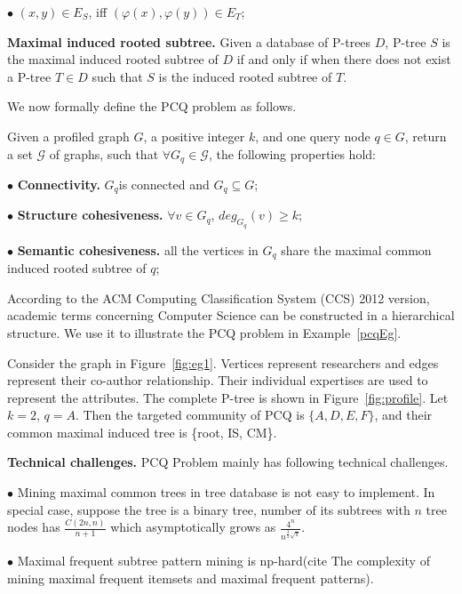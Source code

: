$\bullet$ $(x,y) \in E_S$, iff $(\varphi(x),\varphi(y)) \in E_T$;

{\bf Maximal induced rooted subtree.}
Given a database of P-trees $D$, P-tree $S$ is the maximal induced rooted subtree of $D$ if and only if when there does not exist a P-tree $T \in D$ such that $S$ is the induced rooted subtree of $T$. 

We now formally define the PCQ problem as follows. 

\begin{problem}[PCQ]
Given a profiled graph $G$, a positive integer $k$, and one query node $q \in G$, return a set $\mathcal {G}$ of graphs, such that $\forall G_q \in \mathcal {G}$, the following properties hold:

\vspace{1ex}
$\bullet$ \textbf{Connectivity.} $G_q$is connected and $G_q \subseteq G$;

$\bullet$ \textbf{Structure cohesiveness.} $\forall v\in G_q$, $deg_{G_q}(v)\geq k$;

$\bullet$ \textbf{Semantic cohesiveness.} all the vertices in $G_q$ share the maximal common induced rooted subtree of $q$;
\end{problem}

According to the ACM Computing Classification System (CCS) 2012 version, academic terms concerning Computer Science can be constructed in a hierarchical structure. We use it to illustrate the PCQ problem in Example~\ref{pcqEg}.  

\begin{example}
\label{pcqEg}
Consider the graph in Figure~\ref{fig:eg1}. Vertices represent researchers and edges represent their co-author relationship. Their individual expertises are used to represent the attributes. The complete P-tree is shown in Figure~\ref{fig:profile}. Let $k=2$, $q=A$. Then the targeted community of PCQ is $\{A,D,E,F\}$, and their common maximal induced tree is \{root, IS, CM\}. 
\end{example}

{\bf Technical challenges.}
PCQ Problem mainly has following technical challenges.

$\bullet$ Mining maximal common trees in tree database is not easy to implement. In special case, suppose the tree is a binary tree, number of its subtrees with $n$ tree nodes has $\frac{C(2n,n)}{n+1}$ which asymptotically grows as $\frac{4^n}{n^{\frac{3}{2}\sqrt \pi} }$. 

$\bullet$ Maximal frequent subtree pattern mining is np-hard(cite The complexity of mining maximal frequent itemsets and maximal frequent patterns).

